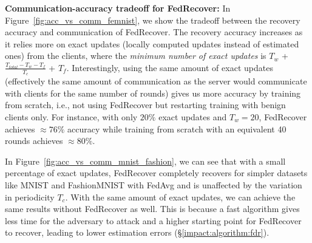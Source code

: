 \noindent\textbf{Communication-accuracy tradeoff for FedRecover:}
In Figure~\ref{fig:acc_vs_comm_femnist}, we show the tradeoff between the recovery accuracy and communication of FedRecover.
The recovery accuracy increases as it relies more on exact updates (locally computed updates instead of estimated ones) from the clients, where the \emph{minimum number of exact updates} is $T_w$ + $\frac{T_{total} - T_w - T_f}{T_c}$ + $T_{f}$. Interestingly, using the same amount of exact updates (effectively the same amount of communication as the server would communicate with clients for the same number of rounds) gives us more accuracy by training from scratch, i.e., not using FedRecover but restarting training with benign clients only. For instance, with only $20\%$ exact updates and $T_w=20$, FedRecover achieves $\approx76\%$ accuracy while training from scratch with an equivalent 40 rounds achieves $\approx80\%$.

In Figure~\ref{fig:acc_vs_comm_mnist_fashion}, we can see that with a small percentage of exact updates, FedRecover completely recovers for simpler datasets like MNIST and FashionMNIST with FedAvg and is unaffected by the variation in periodicity $T_c$. With the same amount of exact updates, we can achieve the same results without FedRecover as well. This is because a fast algorithm gives less time for the adversary to attack and a higher starting point for FedRecover to recover, leading to lower estimation errors (\S\ref{impact:algorithm:fdr}).

